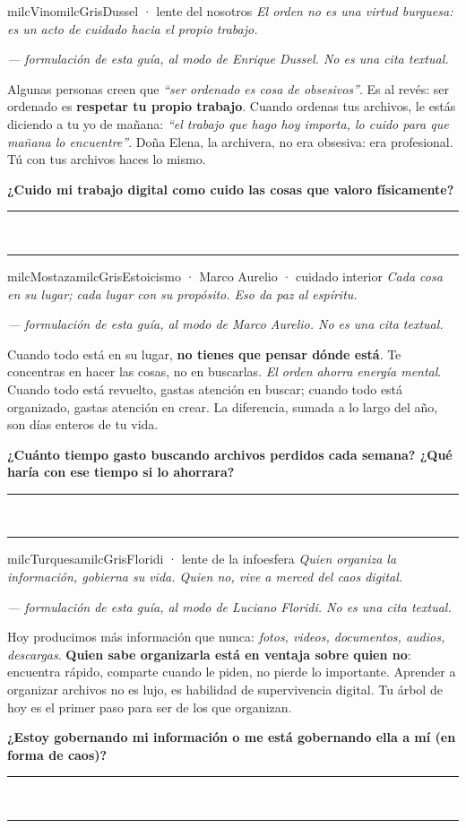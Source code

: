 \documentclass[11pt,letterpaper]{article}
\newcommand{\linead}[1]{\noindent\color{milcLinea}\rule{#1}{0.5pt}\color{milcNegro}}
\begin{document}
\begin{softbox}{milcVino}{milcGris}{Dussel · lente del nosotros}
\textit{El orden no es una virtud burguesa: es un acto de cuidado hacia el propio trabajo.}

{\footnotesize\itshape\color{milcNegro!70}--- formulación de esta guía, al modo de Enrique Dussel. No es una cita textual.}

Algunas personas creen que \emph{``ser ordenado es cosa de obsesivos''}. Es al revés: ser ordenado es \textbf{respetar tu propio trabajo}. Cuando ordenas tus archivos, le estás diciendo a tu yo de mañana: \emph{``el trabajo que hago hoy importa, lo cuido para que mañana lo encuentre''}. Doña Elena, la archivera, no era obsesiva: era profesional. Tú con tus archivos haces lo mismo.

\textbf{¿Cuido mi trabajo digital como cuido las cosas que valoro físicamente?}
\end{softbox}
\linead{\linewidth}\\[1mm]
\linead{\linewidth}

\begin{softbox}{milcMostaza}{milcGris}{Estoicismo · Marco Aurelio · cuidado interior}
\textit{Cada cosa en su lugar; cada lugar con su propósito. Eso da paz al espíritu.}

{\footnotesize\itshape\color{milcNegro!70}--- formulación de esta guía, al modo de Marco Aurelio. No es una cita textual.}

Cuando todo está en su lugar, \textbf{no tienes que pensar dónde está}. Te concentras en hacer las cosas, no en buscarlas. \emph{El orden ahorra energía mental}. Cuando todo está revuelto, gastas atención en buscar; cuando todo está organizado, gastas atención en crear. La diferencia, sumada a lo largo del año, son días enteros de tu vida.

\textbf{¿Cuánto tiempo gasto buscando archivos perdidos cada semana? ¿Qué haría con ese tiempo si lo ahorrara?}
\end{softbox}
\linead{\linewidth}\\[1mm]
\linead{\linewidth}

\begin{softbox}{milcTurquesa}{milcGris}{Floridi · lente de la infoesfera}
\textit{Quien organiza la información, gobierna su vida. Quien no, vive a merced del caos digital.}

{\footnotesize\itshape\color{milcNegro!70}--- formulación de esta guía, al modo de Luciano Floridi. No es una cita textual.}

Hoy producimos más información que nunca: \emph{fotos, videos, documentos, audios, descargas}. \textbf{Quien sabe organizarla está en ventaja sobre quien no}: encuentra rápido, comparte cuando le piden, no pierde lo importante. Aprender a organizar archivos no es lujo, es habilidad de supervivencia digital. Tu árbol de hoy es el primer paso para ser de los que organizan.

\textbf{¿Estoy gobernando mi información o me está gobernando ella a mí (en forma de caos)?}
\end{softbox}
\linead{\linewidth}\\[1mm]
\linead{\linewidth}
\end{document}
